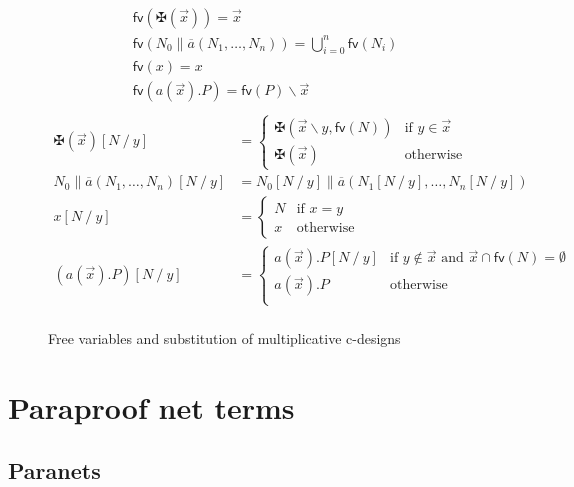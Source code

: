 \documentclass[12pt]{report}
\renewcommand{\setminus}{\mathbin{\backslash}}
\renewcommand{\b}[1]{\overline{#1}}
\newcommand{\dai}{✠}
\newcommand{\cutbar}{\mathbin{\|}}
\newcommand{\freevars}[1]{\mathsf{fv}(#1)}
\newcommand{\subst}[3]{#1\left[#2 \mathbin{/} #3\right]}
\begin{document}
\begin{figure}[h]
    \begin{align*}
        &\freevars{\dai(\vec{x})} = \vec{x} \\
        &\freevars{N_0 \cutbar \b{a}(N_1, \ldots, N_n)} = \bigcup_{i = 0}^n{\freevars{N_i}} \\
        &\freevars{x} = x \\
        &\freevars{a(\vec{x}).P} = \freevars{P} \setminus \vec{x} \\
    \end{align*}
    \begin{align*}
        \subst{\dai(\vec{x})}{N}{y} &= \begin{cases}
            \dai(\vec{x} \setminus y, \freevars{N}) & \text{if $y \in \vec{x}$} \\
            \dai(\vec{x}) & \text{otherwise}
        \end{cases}
        \\
        \subst{N_0 \cutbar \b{a}(N_1, \ldots, N_n)}{N}{y} &=
            \subst{N_0}{N}{y} \cutbar \b{a}(\subst{N_1}{N}{y}, \ldots, \subst{N_n}{N}{y})
        \\
        \subst{x}{N}{y} &= \begin{cases}
            N & \text{if $x = y$} \\
            x & \text{otherwise}
        \end{cases}
        \\
        \subst{(a(\vec{x}).P)}{N}{y} &= \begin{cases}
            a(\vec{x}).\subst{P}{N}{y} & \text{if $y \not\in \vec{x}$ and $\vec{x} ∩ \freevars{N} = \emptyset$} \\
            a(\vec{x}).P & \text{otherwise} \\
        \end{cases}
        \\
    \end{align*}
    \caption[]{Free variables and substitution of multiplicative c-designs}
    \label{def:subst-cdesigns}
\end{figure}


\chapter{Paraproof net terms}
\label{sec:paraproof-net-terms}

\section{Paranets}
\end{document}

